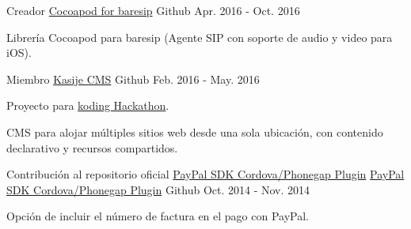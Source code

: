 \begin{cventries}
  \cventry
    {Creador} %
    {\faMobile \hphantom{-} \href{https://github.com/zp1ke/taresip}{Cocoapod for baresip}} %
    {\faGithubSquare\acvHeaderIconSep Github} %
    {Apr. 2016 - Oct. 2016} %
    {
      \begin{cvitems} %
        \item {Librería Cocoapod para baresip (Agente SIP con soporte de audio y video para iOS).}
      \end{cvitems}
    }

  \cventry
    {Miembro} %
    {\href{https://github.com/touwolf/kasije}{Kasije CMS}} %
    {\faGithubSquare\acvHeaderIconSep Github} %
    {Feb. 2016 - May. 2016} %
    {
      \begin{cvitems} %
        \item {Proyecto para \href{https://www.koding.com/Hackathon}{koding Hackathon}.}
        \item {CMS para alojar múltiples sitios web desde una sola ubicación, con contenido declarativo y recursos compartidos.}
      \end{cvitems}
    }

  \cventry
    {Contribución al repositorio oficial \href{https://github.com/paypal/PayPal-Cordova-Plugin}{PayPal SDK Cordova/Phonegap Plugin}} %
    {\faPaypal \hphantom{-} \href{https://github.com/zp1ke/PayPal-Cordova-Plugin}{PayPal SDK Cordova/Phonegap Plugin}} %
    {\faGithubSquare\acvHeaderIconSep Github} %
    {Oct. 2014 - Nov. 2014} %
    {
      \begin{cvitems} %
        \item {Opción de incluir el número de factura en el pago con PayPal.}
      \end{cvitems}
    }

\end{cventries}
